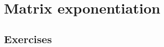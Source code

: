 \documentclass[12pt]{book}
\theoremstyle{definition}
\begin{document}
\begin{taggedexercise}[TODO]

\end{taggedexercise}

\begin{taggedexercise}[TODO]

\end{taggedexercise}

\begin{taggedexercise}[TODO]

\end{taggedexercise}

\begin{taggedexercise}[TODO]

\end{taggedexercise}

\begin{taggedexercise}[TODO]

\end{taggedexercise}

\begin{taggedexercise}[TODO]

\end{taggedexercise}

\begin{taggedexercise}[TODO]

\end{taggedexercise}

\begin{taggedexercise}[TODO]

\end{taggedexercise}

\begin{taggedexercise}[TODO]

\end{taggedexercise}

\chapter{Matrix exponentiation}
\section{Exercises}
\end{document}
